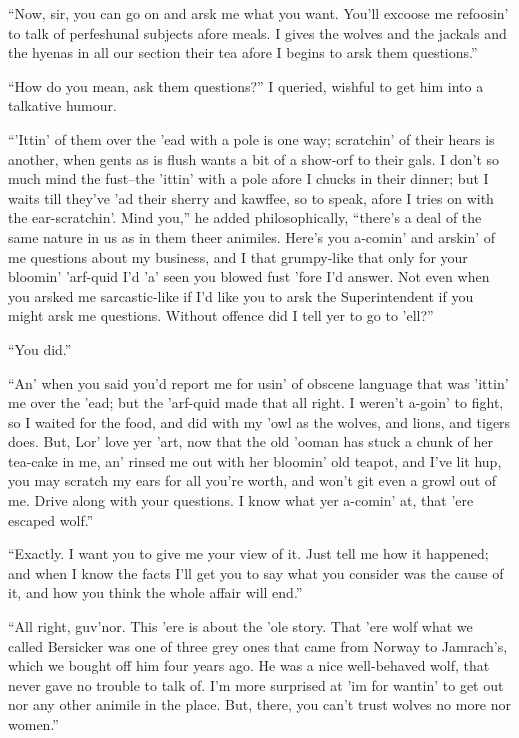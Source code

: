 \documentclass[12pt,openright]{book}
\begin{document}
“Now, sir, you can go on and arsk me what you want. You’ll excoose me refoosin’ to talk of perfeshunal subjects afore meals. I gives the wolves and the jackals and the hyenas in all our section their tea afore I begins to arsk them questions.”

“How do you mean, ask them questions?” I queried, wishful to get him into a talkative humour.

“’Ittin’ of them over the ’ead with a pole is one way; scratchin’ of their hears is another, when gents as is flush wants a bit of a show-orf to their gals. I don’t so much mind the fust–the ’ittin’ with a pole afore I chucks in their dinner; but I waits till they’ve ’ad their sherry and kawffee, so to speak, afore I tries on with the ear-scratchin’. Mind you,” he added philosophically, “there’s a deal of the same nature in us as in them theer animiles. Here’s you a-comin’ and arskin’ of me questions about my business, and I that grumpy-like that only for your bloomin’ ’arf-quid I’d ’a’ seen you blowed fust ’fore I’d answer. Not even when you arsked me sarcastic-like if I’d like you to arsk the Superintendent if you might arsk me questions. Without offence did I tell yer to go to ’ell?”

“You did.”

“An’ when you said you’d report me for usin’ of obscene language that was ’ittin’ me over the ’ead; but the ’arf-quid made that all right. I weren’t a-goin’ to fight, so I waited for the food, and did with my ’owl as the wolves, and lions, and tigers does. But, Lor’ love yer ’art, now that the old ’ooman has stuck a chunk of her tea-cake in me, an’ rinsed me out with her bloomin’ old teapot, and I’ve lit hup, you may scratch my ears for all you’re worth, and won’t git even a growl out of me. Drive along with your questions. I know what yer a-comin’ at, that ’ere escaped wolf.”

“Exactly. I want you to give me your view of it. Just tell me how it happened; and when I know the facts I’ll get you to say what you consider was the cause of it, and how you think the whole affair will end.”

“All right, guv’nor. This ’ere is about the ’ole story. That ’ere wolf what we called Bersicker was one of three grey ones that came from Norway to Jamrach’s, which we bought off him four years ago. He was a nice well-behaved wolf, that never gave no trouble to talk of. I’m more surprised at ’im for wantin’ to get out nor any other animile in the place. But, there, you can’t trust wolves no more nor women.”
\end{document}
